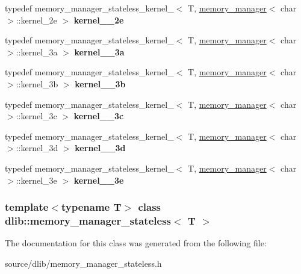 \begin{DoxyCompactItemize}
\item 
\hypertarget{classdlib_1_1memory__manager__stateless_acec239d5fff9ea81ddccd81100b2a927}{
typedef memory\_\-manager\_\-stateless\_\-kernel\_$<$ T, \hyperlink{classdlib_1_1memory__manager}{memory\_\-manager}$<$ char $>$::kernel\_\-2e $>$ {\bfseries kernel\_\_\-2e}}
\label{classdlib_1_1memory__manager__stateless_acec239d5fff9ea81ddccd81100b2a927}

\item 
\hypertarget{classdlib_1_1memory__manager__stateless_a0bc8d09aafdc4c218254b29d7e2d9326}{
typedef memory\_\-manager\_\-stateless\_\-kernel\_$<$ T, \hyperlink{classdlib_1_1memory__manager}{memory\_\-manager}$<$ char $>$::kernel\_\-3a $>$ {\bfseries kernel\_\_\-3a}}
\label{classdlib_1_1memory__manager__stateless_a0bc8d09aafdc4c218254b29d7e2d9326}

\item 
\hypertarget{classdlib_1_1memory__manager__stateless_ab6908bd19b06e671d11ec830a0d03c33}{
typedef memory\_\-manager\_\-stateless\_\-kernel\_$<$ T, \hyperlink{classdlib_1_1memory__manager}{memory\_\-manager}$<$ char $>$::kernel\_\-3b $>$ {\bfseries kernel\_\_\-3b}}
\label{classdlib_1_1memory__manager__stateless_ab6908bd19b06e671d11ec830a0d03c33}

\item 
\hypertarget{classdlib_1_1memory__manager__stateless_a0f5e82aea3130f4cfdd1b380e2b815ac}{
typedef memory\_\-manager\_\-stateless\_\-kernel\_$<$ T, \hyperlink{classdlib_1_1memory__manager}{memory\_\-manager}$<$ char $>$::kernel\_\-3c $>$ {\bfseries kernel\_\_\-3c}}
\label{classdlib_1_1memory__manager__stateless_a0f5e82aea3130f4cfdd1b380e2b815ac}

\item 
\hypertarget{classdlib_1_1memory__manager__stateless_abd2eec897ae2265af87ea1ef74d93b4e}{
typedef memory\_\-manager\_\-stateless\_\-kernel\_$<$ T, \hyperlink{classdlib_1_1memory__manager}{memory\_\-manager}$<$ char $>$::kernel\_\-3d $>$ {\bfseries kernel\_\_\-3d}}
\label{classdlib_1_1memory__manager__stateless_abd2eec897ae2265af87ea1ef74d93b4e}

\item 
\hypertarget{classdlib_1_1memory__manager__stateless_a99e1a20cd5911574ff452884b4f4d1be}{
typedef memory\_\-manager\_\-stateless\_\-kernel\_$<$ T, \hyperlink{classdlib_1_1memory__manager}{memory\_\-manager}$<$ char $>$::kernel\_\-3e $>$ {\bfseries kernel\_\_\-3e}}
\label{classdlib_1_1memory__manager__stateless_a99e1a20cd5911574ff452884b4f4d1be}

\end{DoxyCompactItemize}
\subsubsection*{template$<$typename T$>$ class dlib::memory\_\-manager\_\-stateless$<$ T $>$}



The documentation for this class was generated from the following file:\begin{DoxyCompactItemize}
\item 
source/dlib/memory\_\-manager\_\-stateless.h\end{DoxyCompactItemize}

